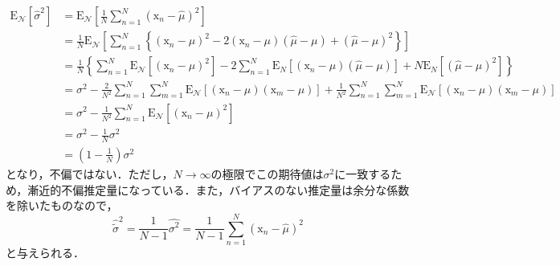 \documentclass[a4paper,11pt]{jsreport}
\begin{document}
\begin{align*}
  \mathrm{E}_\mathcal{N}\left[\hat{\sigma}^2\right]
   & =\mathrm{E}_\mathcal{N}\left[\frac{1}{N} \sum_{n=1}^N\left(\mathrm{x}_n-\hat{\mu}\right)^2\right]                                                                                                                                       \\
   & =\frac{1}{N} \mathrm{E}_\mathcal{N}\left[\sum_{n=1}^N\left\{\left(\mathrm{x}_n-\mu\right)^2-2\left(\mathrm{x}_n-\mu\right)(\hat{\mu}-\mu)+(\hat{\mu}-\mu)^2\right\}\right]                                                                       \\
   & =\frac{1}{N}\left\{\sum_{n=1}^N \mathrm{E}_\mathcal{N}\left[\left(\mathrm{x}_n-\mu\right)^2\right]-2 \sum_{n=1}^N \mathrm{E}_N\left[\left(\mathrm{x}_n-\mu\right)(\hat{\mu}-\mu)\right]+N \mathrm{E}_N\left[(\hat{\mu}-\mu)^2\right]\right\}                       \\
   & =\sigma^2-\frac{2}{N^2} \sum_{n=1}^N \sum_{m=1}^N \mathrm{E}_\mathcal{N}\left[\left(\mathrm{x}_n-\mu\right)\left(\mathrm{x}_m-\mu\right)\right]+\frac{1}{N^2} \sum_{n=1}^N \sum_{m=1}^N \mathrm{E}_\mathcal{N}\left[\left(\mathrm{x}_n-\mu\right)\left(\mathrm{x}_m-\mu\right)\right] \\
   & =\sigma^2-\frac{1}{N^2} \sum_{n=1}^N \mathrm{E}_\mathcal{N}\left[\left(\mathrm{x}_n-\mu\right)^2\right]                                                                                                                                 \\
   & =\sigma^2-\frac{1}{N} \sigma^2                                                                                                                                                                              \\
   & =\left(1-\frac{1}{N}\right) \sigma^2
\end{align*}
となり，不偏ではない．ただし，$N \rightarrow \infty$の極限でこの期待値は$\sigma^2$に一致するため，漸近的不偏推定量になっている．また，バイアスのない推定量は余分な係数を除いたものなので，
\begin{equation}
  \hat{\tilde{\sigma}}^2 
  = \frac{1}{N - 1} \hat{\sigma^2} = \frac{1}{N - 1} \sum_{n=1}^N (\mathrm{x}_n - \hat{\mu})^2
\end{equation}
と与えられる．
\end{document}
